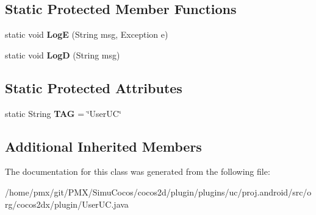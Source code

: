 \subsection*{Static Protected Member Functions}
\begin{DoxyCompactItemize}
\item 
\mbox{\label{classorg_1_1cocos2dx_1_1plugin_1_1UserUC_a76530a9e98c24a49c24b59b57cdb4f47}} 
static void {\bfseries LogE} (String msg, Exception e)
\item 
\mbox{\label{classorg_1_1cocos2dx_1_1plugin_1_1UserUC_a600d00a1380b91f499d78989ea3a681f}} 
static void {\bfseries LogD} (String msg)
\end{DoxyCompactItemize}
\subsection*{Static Protected Attributes}
\begin{DoxyCompactItemize}
\item 
\mbox{\label{classorg_1_1cocos2dx_1_1plugin_1_1UserUC_a22630ff8ea291a2ac065c5d596dcacb2}} 
static String {\bfseries T\+AG} = \char`\"{}User\+UC\char`\"{}
\end{DoxyCompactItemize}
\subsection*{Additional Inherited Members}


The documentation for this class was generated from the following file\+:\begin{DoxyCompactItemize}
\item 
/home/pmx/git/\+P\+M\+X/\+Simu\+Cocos/cocos2d/plugin/plugins/uc/proj.\+android/src/org/cocos2dx/plugin/User\+U\+C.\+java\end{DoxyCompactItemize}
